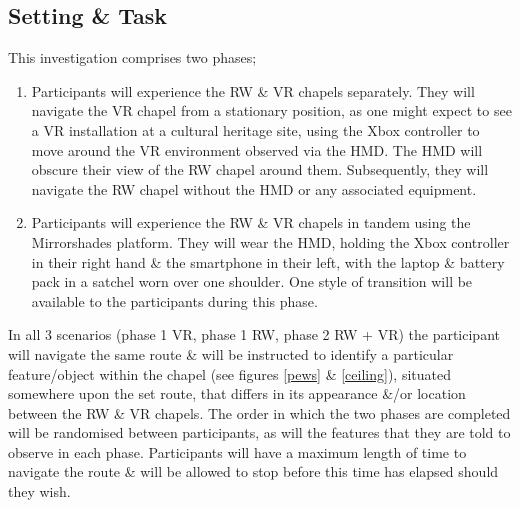 
\subsection{Setting \& Task}
This investigation comprises two phases;

\begin{enumerate}
	\item Participants will experience the RW \& VR chapels separately. They will navigate the VR chapel from a stationary position, as one might expect to see a VR installation at a cultural heritage site, using the Xbox controller to move around the VR environment observed via the HMD. The HMD will obscure their view of the RW chapel around them. Subsequently, they will navigate the RW chapel without the HMD or any associated equipment.
	\item Participants will experience the RW \& VR chapels in tandem using the Mirrorshades platform. They will wear the HMD, holding the Xbox controller in their right hand \& the smartphone in their left, with the laptop \& battery pack in a satchel worn over one shoulder. One style of transition will be available to the participants during this phase.
\end{enumerate}

In all 3 scenarios (phase 1 VR, phase 1 RW, phase 2 RW + VR) the participant will navigate the same route \& will be instructed to identify a particular feature/object within the chapel (see figures \ref{pews} \& \ref{ceiling}), situated somewhere upon the set route, that differs in its appearance \&/or location between the RW \& VR chapels. The order in which the two phases are completed will be randomised between participants, as will the features that they are told to observe in each phase. Participants will have a maximum length of time to navigate the route \& will be allowed to stop before this time has elapsed should they wish.



